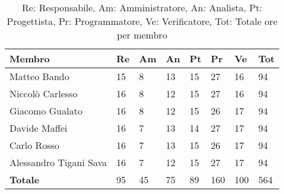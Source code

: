 \documentclass[a4paper, 12pt]{article}
\begin{document}
\begin{table}[H]
	\renewcommand{\arraystretch}{1.5}
	\centering
	\begin{tabular}{l|l|l|l|l|l|l|l}
		\textbf{Membro}        & \textbf{Re} & \textbf{Am} & \textbf{An}  & \textbf{Pt}
		                       & \textbf{Pr} & \textbf{Ve} & \textbf{Tot}                                 \\
		\toprule
		Matteo Bando           & 15          & 8           & 13           & 15          & 27  & 16  & 94  \\
		Niccolò Carlesso       & 16          & 8           & 12           & 15          & 27  & 16  & 94  \\
		Giacomo Gualato        & 16          & 8           & 12           & 15          & 26  & 17  & 94  \\
		Davide Maffei          & 16          & 7           & 13           & 14          & 27  & 17  & 94  \\
		Carlo Rosso            & 16          & 7           & 13           & 15          & 26  & 17  & 94  \\
		Alessandro Tigani Sava & 16          & 7           & 12           & 15          & 27  & 17  & 94  \\
		\bottomrule
		\textbf{Totale}        & 95          & 45          & 75           & 89          & 160 & 100 & 564 \\
	\end{tabular}

	\caption{Re: Responsabile, Am: Amministratore, An: Analista, Pt:
		Progettista, Pr: Programmatore, Ve: Verificatore, Tot: Totale ore per
		membro}
\end{table}
\end{document}
